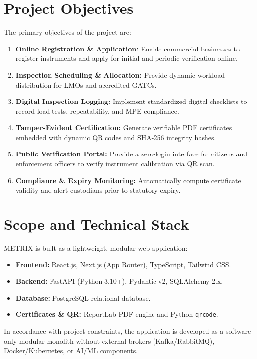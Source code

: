 \section{Project Objectives}
The primary objectives of the project are:
\begin{enumerate}
    \item \textbf{Online Registration \& Application:} Enable commercial businesses to register instruments and apply for initial and periodic verification online.
    \item \textbf{Inspection Scheduling \& Allocation:} Provide dynamic workload distribution for LMOs and accredited GATCs.
    \item \textbf{Digital Inspection Logging:} Implement standardized digital checklists to record load tests, repeatability, and MPE compliance.
    \item \textbf{Tamper-Evident Certification:} Generate verifiable PDF certificates embedded with dynamic QR codes and SHA-256 integrity hashes.
    \item \textbf{Public Verification Portal:} Provide a zero-login interface for citizens and enforcement officers to verify instrument calibration via QR scan.
    \item \textbf{Compliance \& Expiry Monitoring:} Automatically compute certificate validity and alert custodians prior to statutory expiry.
\end{enumerate}

\section{Scope and Technical Stack}
METRIX is built as a lightweight, modular web application:
\begin{itemize}
    \item \textbf{Frontend:} React.js, Next.js (App Router), TypeScript, Tailwind CSS.
    \item \textbf{Backend:} FastAPI (Python 3.10+), Pydantic v2, SQLAlchemy 2.x.
    \item \textbf{Database:} PostgreSQL relational database.
    \item \textbf{Certificates \& QR:} ReportLab PDF engine and Python \texttt{qrcode}.
\end{itemize}
In accordance with project constraints, the application is developed as a software-only modular monolith without external brokers (Kafka/RabbitMQ), Docker/Kubernetes, or AI/ML components.
